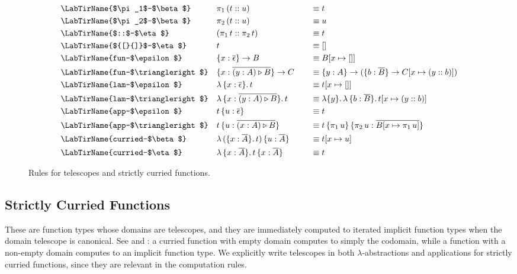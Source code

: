 \documentclass[acmsmall,screen,dvipsnames]{acmart}\settopmatter{}
\newcommand{\TCons}{\triangleright}
\newcommand{\ol}[1]{\overline{#1}}
\theoremstyle{remark}
\begin{document}
\begin{figure}[h]
\begin{alignat*}{3}
  & \text{\LabTirName{$\pi_1$-$\beta$}}\hspace{2em}  && \pi_1\,(t :: u) && \equiv t\\
  & \text{\LabTirName{$\pi_2$-$\beta$}}  && \pi_2\,(t :: u) && \equiv u\\
  & \text{\LabTirName{$::$-$\eta$}}  && (\pi_1\,t :: \pi_2\,t) && \equiv t\\
  & \text{\LabTirName{${[}{]}$-$\eta$}}  && t && \equiv []\\
  & \text{\LabTirName{fun-$\epsilon$}}\hspace{3em} && \{x : \ol{\epsilon}\}\to B && \equiv B[x \mapsto []]\\
  & \text{\LabTirName{fun-$\TCons$}}         && \{x : \ol{(y : A) \TCons B}\}\to C \quad && \equiv
                                               \{y : A\}\to(\{b : \ol{B}\}\to C[x \mapsto (y :: b)])\\
  & \text{\LabTirName{lam-$\epsilon$}}       && \lambda\,\{x : \ol{\epsilon}\}.\,t && \equiv t[x \mapsto []]\\
  & \text{\LabTirName{lam-$\TCons$}}         && \lambda\,\{x : \ol{(y : A)\TCons B}\}.\,t && \equiv
                                         \lambda\{y\}.\,\lambda\,\{b : \ol{B}\}.\,t[x \mapsto (y :: b)]\\
  & \text{\LabTirName{app-$\epsilon$}}       && t\,\{u : \ol{\epsilon}\} && \equiv t\\
  & \text{\LabTirName{app-$\TCons$}}         && t\,\{u : \ol{(x : A) \TCons B}\} &&\equiv
                                         t\,\{\pi_1\,u\}\,\{\pi_2\,u : \ol{B[x \mapsto \pi_1\,u]}\}\\
  & \text{\LabTirName{curried-$\beta$}} && \lambda\,(\{x : \ol{A}\}.\,t)\,\{u:\ol{A}\} &&\equiv
                                                             t[x \mapsto u]\\
  & \text{\LabTirName{curried-$\eta$}}  && \lambda\,\{x : \ol{A}\}.\,t\,\{x : \ol{A}\} && \equiv t
\end{alignat*}

\caption{Rules for telescopes and strictly curried functions.}
\label{fig:telescopes}
\end{figure}


\subsection{Strictly Curried Functions}

These are function types whose domains are telescopes, and they are immediately
computed to iterated implicit function types when the domain telescope is
canonical.  See  and \LabTirName{fun-$\TCons$}: a
curried function with empty domain computes to simply the codomain, while a
function with a non-empty domain computes to an implicit function type. We
explicitly write telescopes in both $\lambda$-abstractions and applications for
strictly curried functions, since they are relevant in the computation rules.
\end{document}
